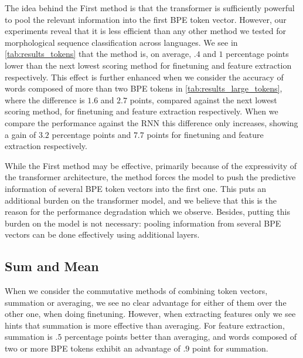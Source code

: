 \documentclass[11pt]{article}
\begin{document}
            The idea behind the First method is that the transformer is
     sufficiently powerful to pool the relevant information into the
     first BPE token vector.
                            However, our experiments reveal that it is
     less efficient than any other method we tested for morphological
     sequence classification across languages. We see in
     \cref{tab:results_tokens} that the method is, on average, $.4$
     and $1$ percentage points lower than the next lowest scoring
     method for finetuning and feature extraction respectively.
             This effect is further enhanced when we consider the
     accuracy of words composed of more than two BPE tokens in
     \cref{tab:results_large_tokens}, where the difference is $1.6$
     and $2.7$ points, compared against the next lowest scoring
     method, for finetuning and feature extraction respectively. When
     we compare the performance against the RNN this difference only
     increases, showing a gain of $3.2$ percentage points and $7.7$
     points for finetuning and feature extraction respectively.

                             While the First method may be effective,
     primarily because of the expressivity of the transformer
     architecture, the method forces the model to push the predictive
     information of several BPE token vectors into the first one. This
     puts an additional burden on the transformer model, and we believe that this
     is the reason for the performance degradation which we observe.
     Besides, putting this burden on the model is not necessary: pooling
     information from several BPE vectors can be done effectively using additional layers.

    \subsection{Sum and Mean}
                When we consider the commutative methods of combining
     token vectors, summation or averaging, we see no clear advantage
     for either of them over the other one, when doing
     finetuning. However, when extracting features only we see hints
     that summation is more effective than averaging. For feature
     extraction, summation is $.5$ percentage points better than
     averaging, and words composed of two or more BPE tokens exhibit
     an advantage of $.9$ point for summation.
    
\end{document}
